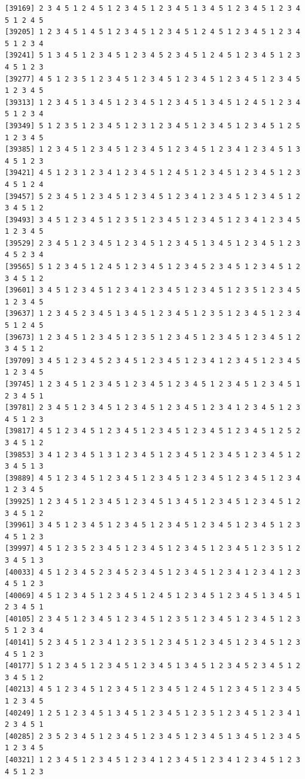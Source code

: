 \documentclass[
  english,
]{book}
\begin{document}
\begin{verbatim}
[39169] 2 3 4 5 1 2 4 5 1 2 3 4 5 1 2 3 4 5 1 3 4 5 1 2 3 4 5 1 2 3 4 5 1 2 4 5
[39205] 1 2 3 4 5 1 4 5 1 2 3 4 5 1 2 3 4 5 1 2 4 5 1 2 3 4 5 1 2 3 4 5 1 2 3 4
[39241] 5 1 3 4 5 1 2 3 4 5 1 2 3 4 5 2 3 4 5 1 2 4 5 1 2 3 4 5 1 2 3 4 5 1 2 3
[39277] 4 5 1 2 3 5 1 2 3 4 5 1 2 3 4 5 1 2 3 4 5 1 2 3 4 5 1 2 3 4 5 1 2 3 4 5
[39313] 1 2 3 4 5 1 3 4 5 1 2 3 4 5 1 2 3 4 5 1 3 4 5 1 2 4 5 1 2 3 4 5 1 2 3 4
[39349] 5 1 2 3 5 1 2 3 4 5 1 2 3 1 2 3 4 5 1 2 3 4 5 1 2 3 4 5 1 2 5 1 2 3 4 5
[39385] 1 2 3 4 5 1 2 3 4 5 1 2 3 4 5 1 2 3 4 5 1 2 3 4 1 2 3 4 5 1 3 4 5 1 2 3
[39421] 4 5 1 2 3 1 2 3 4 1 2 3 4 5 1 2 4 5 1 2 3 4 5 1 2 3 4 5 1 2 3 4 5 1 2 4
[39457] 5 2 3 4 5 1 2 3 4 5 1 2 3 4 5 1 2 3 4 1 2 3 4 5 1 2 3 4 5 1 2 3 4 5 1 2
[39493] 3 4 5 1 2 3 4 5 1 2 3 5 1 2 3 4 5 1 2 3 4 5 1 2 3 4 1 2 3 4 5 1 2 3 4 5
[39529] 2 3 4 5 1 2 3 4 5 1 2 3 4 5 1 2 3 4 5 1 3 4 5 1 2 3 4 5 1 2 3 4 5 2 3 4
[39565] 5 1 2 3 4 5 1 2 4 5 1 2 3 4 5 1 2 3 4 5 2 3 4 5 1 2 3 4 5 1 2 3 4 5 1 2
[39601] 3 4 5 1 2 3 4 5 1 2 3 4 1 2 3 4 5 1 2 3 4 5 1 2 3 5 1 2 3 4 5 1 2 3 4 5
[39637] 1 2 3 4 5 2 3 4 5 1 3 4 5 1 2 3 4 5 1 2 3 5 1 2 3 4 5 1 2 3 4 5 1 2 4 5
[39673] 1 2 3 4 5 1 2 3 4 5 1 2 3 5 1 2 3 4 5 1 2 3 4 5 1 2 3 4 5 1 2 3 4 5 1 2
[39709] 3 4 5 1 2 3 4 5 2 3 4 5 1 2 3 4 5 1 2 3 4 1 2 3 4 5 1 2 3 4 5 1 2 3 4 5
[39745] 1 2 3 4 5 1 2 3 4 5 1 2 3 4 5 1 2 3 4 5 1 2 3 4 5 1 2 3 4 5 1 2 3 4 5 1
[39781] 2 3 4 5 1 2 3 4 5 1 2 3 4 5 1 2 3 4 5 1 2 3 4 1 2 3 4 5 1 2 3 4 5 1 2 3
[39817] 4 5 1 2 3 4 5 1 2 3 4 5 1 2 3 4 5 1 2 3 4 5 1 2 3 4 5 1 2 5 2 3 4 5 1 2
[39853] 3 4 1 2 3 4 5 1 3 1 2 3 4 5 1 2 3 4 5 1 2 3 4 5 1 2 3 4 5 1 2 3 4 5 1 3
[39889] 4 5 1 2 3 4 5 1 2 3 4 5 1 2 3 4 5 1 2 3 4 5 1 2 3 4 5 1 2 3 4 1 2 3 4 5
[39925] 1 2 3 4 5 1 2 3 4 5 1 2 3 4 5 1 3 4 5 1 2 3 4 5 1 2 3 4 5 1 2 3 4 5 1 2
[39961] 3 4 5 1 2 3 4 5 1 2 3 4 5 1 2 3 4 5 1 2 3 4 5 1 2 3 4 5 1 2 3 4 5 1 2 3
[39997] 4 5 1 2 3 5 2 3 4 5 1 2 3 4 5 1 2 3 4 5 1 2 3 4 5 1 2 3 5 1 2 3 4 5 1 3
[40033] 4 5 1 2 3 4 5 2 3 4 5 2 3 4 5 1 2 3 4 5 1 2 3 4 1 2 3 4 1 2 3 4 5 1 2 3
[40069] 4 5 1 2 3 4 5 1 2 3 4 5 1 2 4 5 1 2 3 4 5 1 2 3 4 5 1 3 4 5 1 2 3 4 5 1
[40105] 2 3 4 5 1 2 3 4 5 1 2 3 4 5 1 2 3 5 1 2 3 4 5 1 2 3 4 5 1 2 3 5 1 2 3 4
[40141] 5 2 3 4 5 1 2 3 4 1 2 3 5 1 2 3 4 5 1 2 3 4 5 1 2 3 4 5 1 2 3 4 5 1 2 3
[40177] 5 1 2 3 4 5 1 2 3 4 5 1 2 3 4 5 1 3 4 5 1 2 3 4 5 2 3 4 5 1 2 3 4 5 1 2
[40213] 4 5 1 2 3 4 5 1 2 3 4 5 1 2 3 4 5 1 2 4 5 1 2 3 4 5 1 2 3 4 5 1 2 3 4 5
[40249] 1 2 5 1 2 3 4 5 1 3 4 5 1 2 3 4 5 1 2 3 5 1 2 3 4 5 1 2 3 4 1 2 3 4 5 1
[40285] 2 3 5 2 3 4 5 1 2 3 4 5 1 2 3 4 5 1 2 3 4 5 1 3 4 5 1 2 3 4 5 1 2 3 4 5
[40321] 1 2 3 4 5 1 2 3 4 5 1 2 3 4 1 2 3 4 5 1 2 3 4 1 2 3 4 5 1 2 3 4 5 1 2 3

\end{verbatim}
\end{document}

